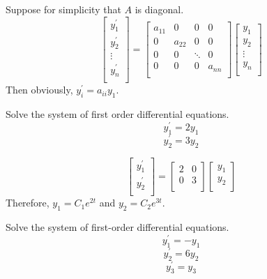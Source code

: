 Suppose for simplicity that \(A\) is diagonal.
\[
    \begin{bmatrix}
         y^{\prime} _1 \\
          y^{\prime} _2\\
          \vdots\\
          y^{\prime} _n\\
    \end{bmatrix} = \begin{bmatrix}
        a_{11}  & 0 &0  &0   \\
         0&a_{22}  &0  &0   \\
         0&  0&\ddots  &0   \\
         0&  0&  0&   a_{nn} \\
    \end{bmatrix} \begin{bmatrix}
         y_1 \\
          y_2\\
          \vdots\\
          y_n\\
    \end{bmatrix}
\]
Then obviously, \(y^{\prime}_i =a_{ii}y_1 \).
\begin{exercise}
    Solve the system of first order differential equations.
    \[
        y_1^{\prime} =2y_1
    \]
    \[
        y_2^{\prime} =3y_2
    \]
\end{exercise}
\begin{solution}
    \[
        \begin{bmatrix}
             y_1^{\prime}  \\
              y_2^{\prime} \\
        \end{bmatrix} = \begin{bmatrix}
            2 &0   \\
             0&3   \\
        \end{bmatrix} \begin{bmatrix}
             y_1 \\
             y_2 \\
        \end{bmatrix}
    \]
    Therefore, \(y_1 = C_1e^{2t} \) and \(y_2 =C_2e^{3t} \).
\end{solution}
\begin{exercise}
    Solve the system of first-order differential equations.
    \[
        y_1^{\prime} =-y_1
    \]
    \[
        y_2^{\prime} =6y_2
    \]
    \[
        y_3^{\prime} =y_3
    \]
\end{exercise}
